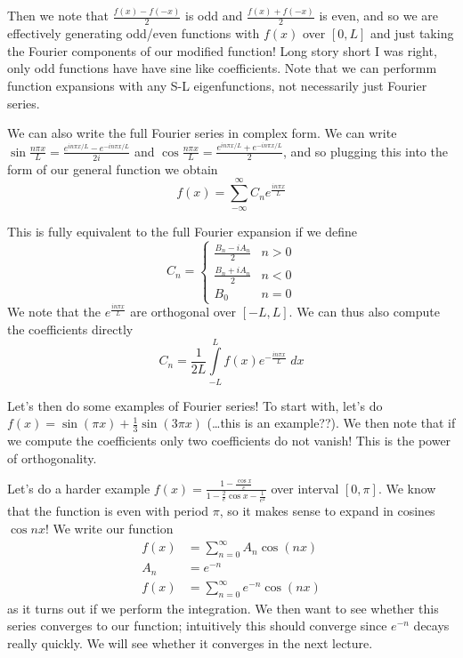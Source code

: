 \documentclass[10pt]{report}
\begin{document}
Then we note that $\frac{f(x) - f(-x)}{2}$ is odd and $\frac{f(x) + f(-x)}{2}$ is even, and so we are effectively generating odd/even functions with $f(x)$ over $[0,L]$ and just taking the Fourier components of our modified function! Long story short I was right, only odd functions have have sine like coefficients. Note that we can performm function expansions with any S-L eigenfunctions, not necessarily just Fourier series.

We can also write the full Fourier series in complex form. We can write $\sin \frac{n\pi x}{L} = \frac{e^{in\pi x/L} - e^{-in\pi x/L}}{2i}$ and $\cos \frac{n\pi x}{L} = \frac{e^{in\pi x/L} + e^{-in\pi x/L}}{2}$, and so plugging this into the form of our general function we obtain
\begin{equation}
    f(x) = \sum_{-\infty}^{\infty}C_ne^{\frac{in\pi x}{L}}
\end{equation}

This is fully equivalent to the full Fourier expansion if we define
\begin{equation}
    C_n = \begin{cases} \frac{B_n - iA_n}{2} & n > 0\\ \frac{B_n + iA_n}{2} & n < 0 \\ B_0 & n = 0\end{cases}
\end{equation}
We note that the $e^{\frac{in\pi x}{L}}$ are orthogonal over $[-L,L]$. We can thus also compute the coefficients directly
\begin{equation}
    C_n = \frac{1}{2L}\displaystyle\int\limits_{-L}^{L}f(x)e^{-\frac{in\pi x}{L}}\;dx
\end{equation}

Let's then do some examples of Fourier series! To start with, let's do $f(x) = \sin(\pi x) + \frac{1}{3}\sin(3\pi x)$ (\dots this is an example??). We then note that if we compute the coefficients only two coefficients do not vanish! This is the power of orthogonality. 

Let's do a harder example $f(x) = \frac{1 - \frac{\cos x}{e}}{1 - \frac{2}{e}\cos x - \frac{1}{e^2}}$ over interval $[0,\pi]$. We know that the function is even with period $\pi$, so it makes sense to expand in cosines $\cos nx$! We write our function
\begin{align}
    f(x) &= \sum_{n=0}^{\infty}A_n\cos(nx)\\
    A_n &= e^{-n}\\
    f(x) &= \sum_{n=0}^{\infty}e^{-n}\cos(nx)
\end{align}
as it turns out if we perform the integration. We then want to see whether this series converges to our function; intuitively this should converge since $e^{-n}$ decays really quickly. We will see whether it converges in the next lecture.
\end{document}

